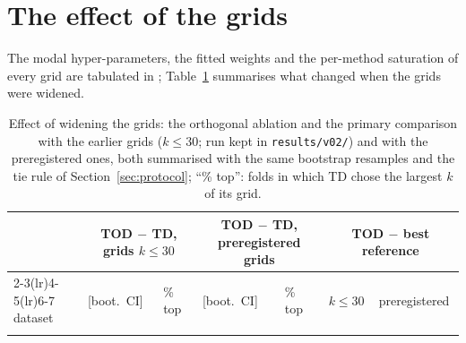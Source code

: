 \documentclass[10pt,a4paper]{article}
\theoremstyle{plain}
\theoremstyle{definition}
\theoremstyle{remark}
\begin{document}
\section{The effect of the grids}\label{app:tables}
The modal hyper-parameters, the fitted weights and the per-method saturation of every grid are tabulated in ; Table~\ref{tab:v02} summarises what changed when the grids were widened.

\begin{table}[htb]
\centering\footnotesize\setlength{\tabcolsep}{3pt}
\begin{tabular}{lllllll}
\toprule
& \multicolumn{2}{c}{TOD $-$ TD, grids $k\le30$} & \multicolumn{2}{c}{TOD $-$ TD, preregistered grids} & \multicolumn{2}{c}{TOD $-$ best reference}\\
\cmidrule(lr){2-3}\cmidrule(lr){4-5}\cmidrule(lr){6-7}
dataset & [boot.\ CI] & \% top & [boot.\ CI] & \% top & $k\le30$ & preregistered\\
\midrule
\\
\bottomrule
\end{tabular}
\caption{Effect of widening the grids: the orthogonal ablation and the primary comparison with the earlier grids ($k\le30$; run kept in \texttt{results/v02/}) and with the preregistered ones, both summarised with the same bootstrap resamples and the tie rule of Section~\ref{sec:protocol}; ``\% top'': folds in which TD chose the largest $k$ of its grid.}
\label{tab:v02}
\end{table}

\renewcommand{\bibfont}{\footnotesize}
\setlength{\bibsep}{0.8pt}


\end{document}
